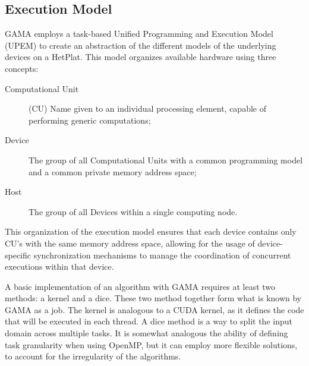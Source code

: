 \subsection{Execution Model}

GAMA employs a task-based Unified Programming and Execution Model (UPEM) to create an abstraction of the different models of the underlying devices on a HetPlat. This model organizes available hardware using three concepts:

\begin{description}
  \item[Computational Unit] (CU) Name given to an individual processing element, capable of performing generic computations;

  \item[Device] The group of all Computational Units with a common programming model and a common private memory address space;

  \item[Host] The group of all Devices within a single computing node.
\end{description}

This organization of the execution model ensures that each device contains only CU's with the same memory address space, allowing for the usage of device-specific synchronization mechanisms to manage the coordination of concurrent executions within that device.

A basic implementation of an algorithm with GAMA requires at least two methods: a kernel and a dice. These two method together form what is known by GAMA as a job. The kernel is analogous to a CUDA kernel, as it defines the code that will be executed in each thread. A dice method is a way to split the input domain across multiple tasks. It is somewhat analogous the ability of defining task granularity when using OpenMP, but it can employ more flexible solutions, to account for the irregularity of the algorithms.

